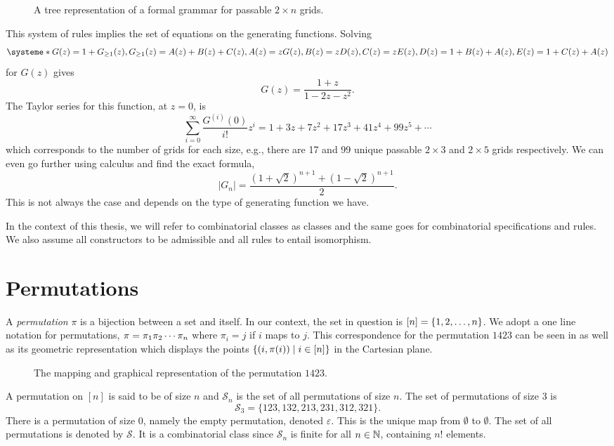 \begin{figure}[htbp]
    \centering
    
    \caption{A tree representation of a formal grammar for passable $2\times n$ grids.}
    \label{fig:gridtree}
\end{figure}

This system of rules implies the set of equations on the generating functions. Solving
\[
    \systeme*{G(z) = 1 + G_{\geq1}(z), G_{\geq1}(z) = A(z) + B(z) + C(z),A(z) = zG(z), B(z) = zD(z), C(z) = zE(z), D(z) = 1+B(z)+A(z), E(z) = 1+C(z)+A(z)}
\]
for $G(z)$ gives 
\[
    G(z) = \frac{1+z}{1-2z-z^2}.
\]
The Taylor series for this function, at $z=0$, is
\[
    \sum_{i=0}^\infty \frac{G^{(i)}(0)}{i!}z^i = 1+3z+7z^2+17z^3+ 41z^4 + 99z^5 + \dotsm
\]
which corresponds to the number of grids for each size, e.g., there are 17 and 99 unique passable $2\times3$ and $2\times5$ grids respectively. We can even go further using calculus and find the exact formula, 
\[
|G_n| = \frac{\left(1+\sqrt{2}\right)^{n+1} + \left(1-\sqrt{2}\right)^{n+1}}{2}.
\]
This is not always the case and depends on the type of generating function we have.

In the context of this thesis, we will refer to combinatorial classes as classes and the same goes for combinatorial specifications and rules. We also assume all constructors to be admissible and all rules to entail isomorphism. 

\section{Permutations\label{sec:permutations}}
A \emph{permutation} $\pi$ is a bijection between a set and itself. In our context, the set in question is $[n] = \left\{1,2,\dotsc,n\right\}$. We adopt a one line notation for permutations, $\pi = \pi_1 \pi_2 \dotsm \pi_{n}$ where $\pi_i = j$ if $i$ maps to $j$. This correspondence for the permutation $1423$ can be seen in  as well as its geometric representation which displays the points $\left\{(i,\pi(i)) \mid i \in [n]\right\}$ in the Cartesian plane.

\begin{figure}[htbp]
    \centering
    
    \caption{The mapping and graphical representation of the permutation $1423$.}
    \label{fig:perm_example}
\end{figure}

A permutation on $[n]$ is said to be of size $n$ and $\mathcal{S}_n$ is the set of all permutations of size $n$. The set of permutations of size 3 is 
\[
    \mathcal{S}_3 = \{123,132,213,231,312,321\}.
\]
There is a permutation of size $0$, namely the empty permutation, denoted $\varepsilon$. This is the unique map from $\emptyset$ to $\emptyset$. The set of all permutations is denoted by $\mathcal{S}$. It is a combinatorial class since $\mathcal{S}_n$ is finite for all $n\in\mathbb{N}$, containing $n!$ elements.

